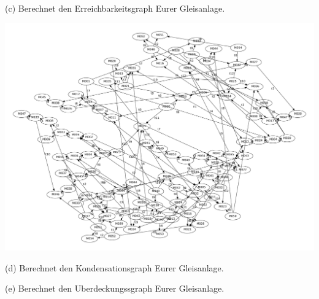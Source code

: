 \documentclass{scrreprt}
\begin{document}
\begin{enumerate}
(c) Berechnet den Erreichbarkeitsgraph Eurer Gleisanlage.

\includegraphics[width=1\textwidth]{eg.pdf}

(d) Berechnet den Kondensationsgraph Eurer Gleisanlage.

(e) Berechnet den Uberdeckungssgraph Eurer Gleisanlage.


\end{enumerate}
\end{document}
